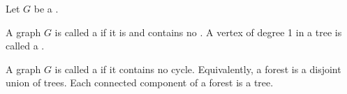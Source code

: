 \begin{definition} \label{definition:tree_forest_in_graph_theory}
Let $G$ be a .

A graph $G$ is called a  if it is  and contains no . A vertex of degree 1 in a tree is called a .

A graph $G$ is called a  if it contains no cycle. Equivalently, a forest is a disjoint union of trees. Each connected component of a forest is a tree.
\end{definition}
